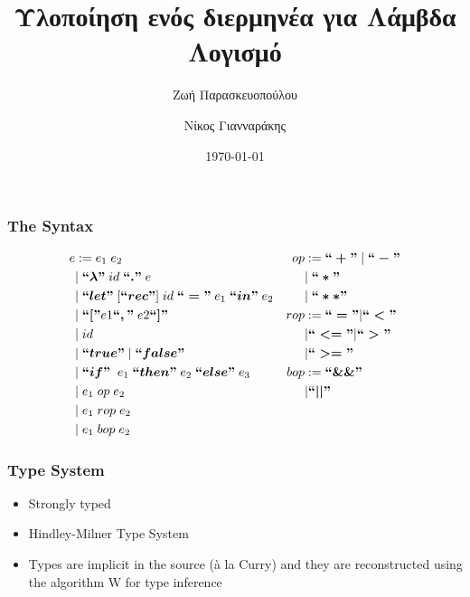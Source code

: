 \documentclass[xcolor=table]{beamer}
\title[The Jebus Lambda Calculus Interpreter]{Υλοποίηση ενός διερμηνέα για Λάμβδα Λογισμό}
\author{Ζωή Παρασκευοπούλου \\ \and Νίκος Γιανναράκης  }
\institute[]
{
Σχολή Ηλεκτρολόγων Μηχανικών και Μηχανικών Υπολογιστών\\
Εθνικό Μετσόβιο Πολυτεχνείο
}
\date{\today}
\newcommand{\bs}[1]{\boldsymbol{#1}}
\begin{document}
\begin{frame}
\titlepage
\end{frame}


\begin{frame}
\frametitle{The Syntax}
\begin{block}
{
\begin{small}
\begin{align*}
e & := e_1 \; e_2 																		                                  & op &:= \bs{``+"}\; | \; \bs{``-"}  \\
   & | \; \bs{``\lambda"} \; id \; \bs{`` ."} \; e 										                  &        & |\; \bs{``*"} \; 	  \\
   & | \; \bs{``let"} \; [\bs{``rec"}] \; id \; \bs{``="} \; e_1 \; \bs{``in"} \; e_2 		  & 		& | \; \bs{``**"}		              \\
   & | \;  \bs{``["}e1\bs{``,"} \; e2\bs{``]"} 													              & rop & := \bs{``="} | \bs{``<"}\\
   & | \;  id 																			 	                                  & 		& | \bs{``<="} | \bs{``>"}\\
   & | \;  \bs{``true"}\; | \;\bs{``false"} 													                  &		& | \bs{``>="} \\
   & | \; \bs{``if"}\; \; e_1\; \bs{``then"}\; e_2\; \bs{``else"}\; e_3    & bop & := \bs{``\&\&"} \\
   & | \; e_1 \; op \; e_2                                                                                         &             & | \bs{``||"} \\
   & | \; e_1 \; rop \; e_2                                                                                          & \\
   & | \; e_1 \; bop \; e_2
\end{align*}
\end{small}

}

\end{block}
\end{frame}

%


\begin{frame}
\frametitle{Type System}
\begin{block}
{
\begin{itemize}
\item Strongly typed
\item Hindley-Milner Type System 
\item Types are implicit in the source (à la Curry) and they are reconstructed using the algorithm W for type inference
\end{itemize}

}
\end{block}


\end{frame}
\end{document}
